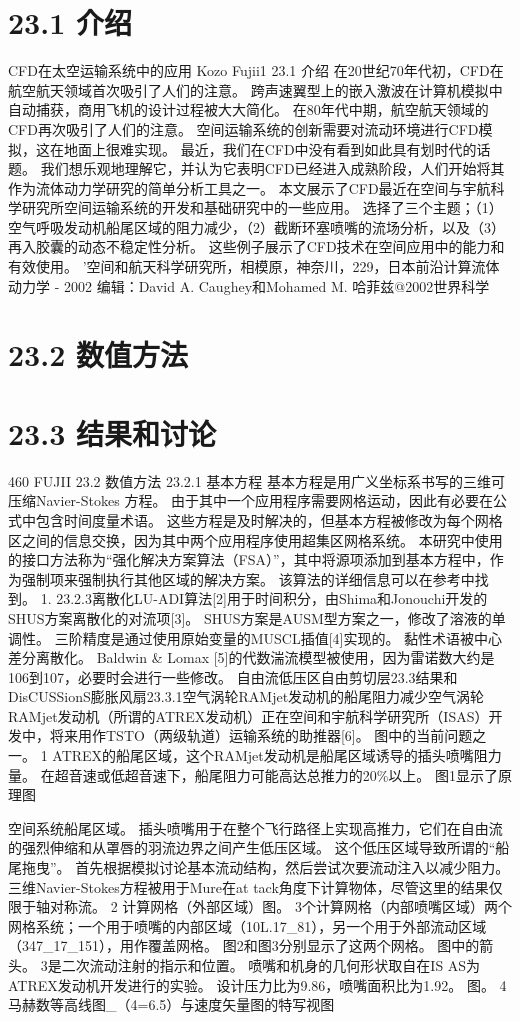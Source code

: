 \documentclass[UTF8,11pt,a4paper,openany,fontset=fandol]{ctexbook}
\begin{document}
\section{23.1 介绍}
CFD在太空运输系统中的应用 Kozo Fujii1 23.1 介绍 在20世纪70年代初，CFD在航空航天领域首次吸引了人们的注意。 跨声速翼型上的嵌入激波在计算机模拟中自动捕获，商用飞机的设计过程被大大简化。 在80年代中期，航空航天领域的CFD再次吸引了人们的注意。 空间运输系统的创新需要对流动环境进行CFD模拟，这在地面上很难实现。 最近，我们在CFD中没有看到如此具有划时代的话题。 我们想乐观地理解它，并认为它表明CFD已经进入成熟阶段，人们开始将其作为流体动力学研究的简单分析工具之一。 本文展示了CFD最近在空间与宇航科学研究所空间运输系统的开发和基础研究中的一些应用。 选择了三个主题；（1）空气呼吸发动机船尾区域的阻力减少，（2）截断环塞喷嘴的流场分析，以及（3）再入胶囊的动态不稳定性分析。 这些例子展示了CFD技术在空间应用中的能力和有效使用。 '空间和航天科学研究所，相模原，神奈川，229，日本前沿计算流体动力学 - 2002 编辑：David A. Caughey和Mohamed M. 哈菲兹@2002世界科学

\section{23.2 数值方法}
\section{23.3 结果和讨论}
460 FUJII 23.2 数值方法 23.2.1 基本方程 基本方程是用广义坐标系书写的三维可压缩Navier-Stokes 方程。 由于其中一个应用程序需要网格运动，因此有必要在公式中包含时间度量术语。 这些方程是及时解决的，但基本方程被修改为每个网格区之间的信息交换，因为其中两个应用程序使用超集区网格系统。 本研究中使用的接口方法称为“强化解决方案算法（FSA）”，其中将源项添加到基本方程中，作为强制项来强制执行其他区域的解决方案。 该算法的详细信息可以在参考中找到。 1. 23.2.3离散化LU-ADI算法[2]用于时间积分，由Shima和Jonouchi开发的SHUS方案离散化的对流项[3]。 SHUS方案是AUSM型方案之一，修改了溶液的单调性。 三阶精度是通过使用原始变量的MUSCL插值[4]实现的。 黏性术语被中心差分离散化。 Baldwin \& Lomax [5]的代数湍流模型被使用，因为雷诺数大约是106到107，必要时会进行一些修改。 自由流低压区自由剪切层23.3结果和DisCUSSionS膨胀风扇23.3.1空气涡轮RAMjet发动机的船尾阻力减少空气涡轮RAMjet发动机（所谓的ATREX发动机）正在空间和宇航科学研究所（ISAS）开发中，将来用作TSTO（两级轨道）运输系统的助推器[6]。 图中的当前问题之一。 1 ATREX的船尾区域，这个RAMjet发动机是船尾区域诱导的插头喷嘴阻力量。 在超音速或低超音速下，船尾阻力可能高达总推力的20\%以上。 图1显示了原理图

空间系统船尾区域。 插头喷嘴用于在整个飞行路径上实现高推力，它们在自由流的强烈伸缩和从罩唇的羽流边界之间产生低压区域。 这个低压区域导致所谓的“船尾拖曳”。 首先根据模拟讨论基本流动结构，然后尝试次要流动注入以减少阻力。 三维Navier-Stokes方程被用于Mure在at tack角度下计算物体，尽管这里的结果仅限于轴对称流。 2 计算网格（外部区域）图。 3个计算网格（内部喷嘴区域）两个网格系统；一个用于喷嘴的内部区域（10L.17\_81），另一个用于外部流动区域（347\_17\_151），用作覆盖网格。 图2和图3分别显示了这两个网格。 图中的箭头。 3是二次流动注射的指示和位置。 喷嘴和机身的几何形状取自在IS AS为ATREX发动机开发进行的实验。 设计压力比为9.86，喷嘴面积比为1.92。 图。 4 马赫数等高线图\_（4=6.5）与速度矢量图的特写视图
\end{document}
